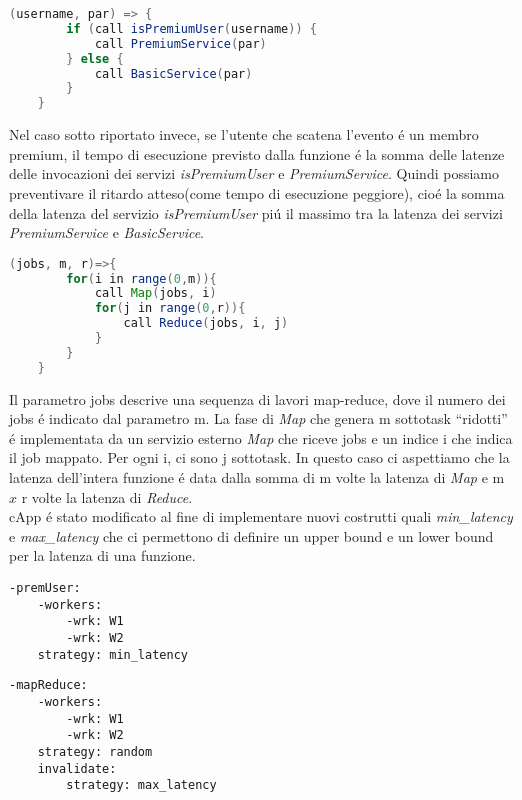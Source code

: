 \documentclass[../../main.tex]{subfiles}
\begin{document}
\begin{lstlisting}[language=Java, caption= La guardia della condizione é un'invocazione a un servizio esterno,label={lst:2}]
    (username, par) => {
        if (call isPremiumUser(username)) {
            call PremiumService(par)
        } else {
            call BasicService(par)
        }
    }
\end{lstlisting}

Nel caso sotto riportato invece, se l'utente che scatena l'evento é un membro premium, il tempo di esecuzione previsto dalla funzione é la somma delle latenze delle invocazioni dei servizi \textit{isPremiumUser} e \textit{PremiumService}.
Quindi possiamo preventivare il ritardo atteso(come tempo di esecuzione peggiore), cioé la somma della latenza del servizio \textit{isPremiumUser} piú il massimo tra la latenza dei servizi \textit{PremiumService} e \textit{BasicService}.

\begin{lstlisting}[language=Java, caption=Funzione con logica Map-Reduce,label={lst:3}]
    (jobs, m, r)=>{
        for(i in range(0,m)){
            call Map(jobs, i)
            for(j in range(0,r)){
                call Reduce(jobs, i, j)
            }
        }
    }
\end{lstlisting}
Il parametro jobs descrive una sequenza di lavori map-reduce, dove il numero dei jobs é indicato dal parametro m.
La fase di \textit{Map} che genera m sottotask ``ridotti'' é implementata da un servizio esterno \textit{Map} che riceve jobs e un indice i che indica il job mappato.
Per ogni i, ci sono j sottotask.
In questo caso ci aspettiamo che la latenza dell'intera funzione é data dalla somma di m volte la latenza di \textit{Map} e m $x$ r volte la latenza di \textit{Reduce}.\\

cApp é stato modificato al fine di implementare nuovi costrutti quali \textit{min\_latency} e \textit{max\_latency} che ci permettono di definire un upper bound e un lower bound per la latenza di una funzione.
\begin{multicols}{2}
    \begin{lstlisting}[caption={cAPP for Listing \ref{lst:1} e \ref{lst:2}},label={lst:4}]
-premUser:
    -workers:
        -wrk: W1
        -wrk: W2
    strategy: min_latency
    \end{lstlisting}
    \columnbreak
    \begin{lstlisting}[caption={cApp for Listing~\ref{lst:3}}, label={lst:5}]
-mapReduce:
    -workers:
        -wrk: W1
        -wrk: W2
    strategy: random
    invalidate:
        strategy: max_latency
    \end{lstlisting}
\end{multicols}
\end{document}
